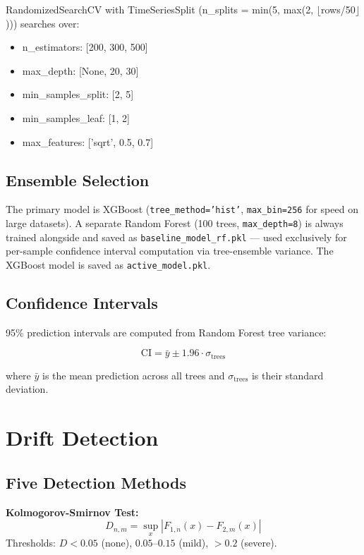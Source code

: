 \documentclass[conference]{IEEEtran}
\begin{document}
RandomizedSearchCV with TimeSeriesSplit (n\_splits = min(5, max(2, $\lfloor$rows/50$\rfloor$))) searches over:

\begin{itemize}
    \item n\_estimators: [200, 300, 500]
    \item max\_depth: [None, 20, 30]
    \item min\_samples\_split: [2, 5]
    \item min\_samples\_leaf: [1, 2]
    \item max\_features: ['sqrt', 0.5, 0.7]
\end{itemize}

\subsection{Ensemble Selection}

The primary model is XGBoost (\texttt{tree\_method='hist'}, \texttt{max\_bin=256} for speed on large datasets). A separate Random Forest (100 trees, \texttt{max\_depth=8}) is always trained alongside and saved as \texttt{baseline\_model\_rf.pkl} — used exclusively for per-sample confidence interval computation via tree-ensemble variance. The XGBoost model is saved as \texttt{active\_model.pkl}.

\subsection{Confidence Intervals}

95\% prediction intervals are computed from Random Forest tree variance:

\begin{equation}
\text{CI} = \bar{y} \pm 1.96 \cdot \sigma_{\text{trees}}
\end{equation}

where $\bar{y}$ is the mean prediction across all trees and $\sigma_{\text{trees}}$ is their standard deviation.

\section{Drift Detection}

\subsection{Five Detection Methods}

\textbf{Kolmogorov-Smirnov Test:}
\begin{equation}
D_{n,m} = \sup_x |F_{1,n}(x) - F_{2,m}(x)|
\end{equation}
Thresholds: $D < 0.05$ (none), $0.05$--$0.15$ (mild), $> 0.2$ (severe).
\end{document}

